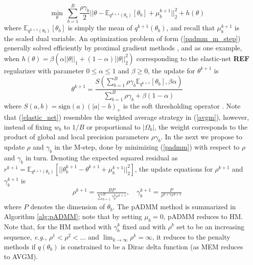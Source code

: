 \documentclass{article}
\newcommand{\eg}[0]{\emph{e.g., }}
\newcommand{\1}[0]{\ensuremath{\boldsymbol{1}}\xspace}
\begin{document}
\begin{equation}\label{padmm_m_step}
\textstyle \min_{\theta} ~\sum_{b=1}^B\frac{\rho\gamma_b}{2}||\theta-\mathbb{E}_{q^{k+1}(\theta_b)}[\theta_b] + \mu^{k+1}_b||^2_2 + h(\theta)
\end{equation}
where $\mathbb{E}_{q^{k+1}(\theta_b)}[\theta_b]$ is simply the mean of $q^{k+1}(\theta_b)$, and recall that $\mu^{k+1}_b$ is the scaled dual variable. An optimization problem of form (\ref{padmm_m_step}) generally solved efficiently by proximal gradient methods \cite{Parikh13}, and as one example, when $h(\theta) = \beta(\alpha||\theta||_1 + (1-\alpha)||\theta||^2_2)$ corresponding to the elastic-net \textbf{REF} regularizer with parameter $0\le\alpha\le 1$ and $\beta\ge0$, the update for $\theta^{k+1}$ is
\begin{equation}\label{elastic_net}
 \theta^{k+1} = \frac{S(\textstyle\sum_{b=1}^B\rho\gamma_b\mathbb{E}_{q^{k+1}}[\theta_b], \beta\alpha )}{\sum_{b=1}^B\rho\gamma_b + \beta(1-\alpha)}
\end{equation}
where $S(a, b) = \mbox{sign}(a)(|a|-b)_{+}$ is the soft thresholding operator \cite{Friedman2010}. Note that (\ref{elastic_net}) resembles the weighted average strategy in (\ref{avgm}), however, instead of fixing $w_b$ to $1/B$ or proportional to $|\Omega_b|$, the weight corresponds to the product of global and local precision parameters $\rho\gamma_b$. In the next we propose to update $\rho$ and $\gamma_b$ in the M-step, done by minimizing (\ref{padmm}) with respect to $\rho$ and $\gamma_b$ in turn. Denoting the expected squared residual as $r^{k+1} = \mathbb{E}_{q^{k+1}(\theta_b)}[||\theta_b^{k+1}-\theta^{k+1}+\mu_b^{k+1}||_2^2]$, the update equations for $\rho^{k+1}$ and $\gamma_b^{k+1}$ is
\begin{equation}\label{em_bayes}
\begin{gathered}
\textstyle \rho^{k+1} = \frac{BP}{\sum_{b=1}^B\gamma_b^kr^{k+1}}, \quad \gamma_b^{k+1} = \frac{P}{\rho^{k+1}r^{k+1}}
\end{gathered}
\end{equation}
where $P$ denotes the dimension of $\theta_b$. The pADMM method is summarized in Algorithm \ref{alg:pADMM}; note that by setting $\mu_b = 0$, pADMM reduces to HM. Note that, for the HM method with $\gamma_b^k$ fixed and with $\rho^k$ set to be an increasing sequence, \eg $\rho^1 < \rho^2 < \ldots$ and $\lim_{k\to\infty}\rho^{k} = \infty$, it reduces to the penalty methods \cite{Bertsekas1989, Bertsekas1996} if $q(\theta_b)$ is constrained to be a Dirac delta function (as MEM reduces to AVGM).
\end{document}
